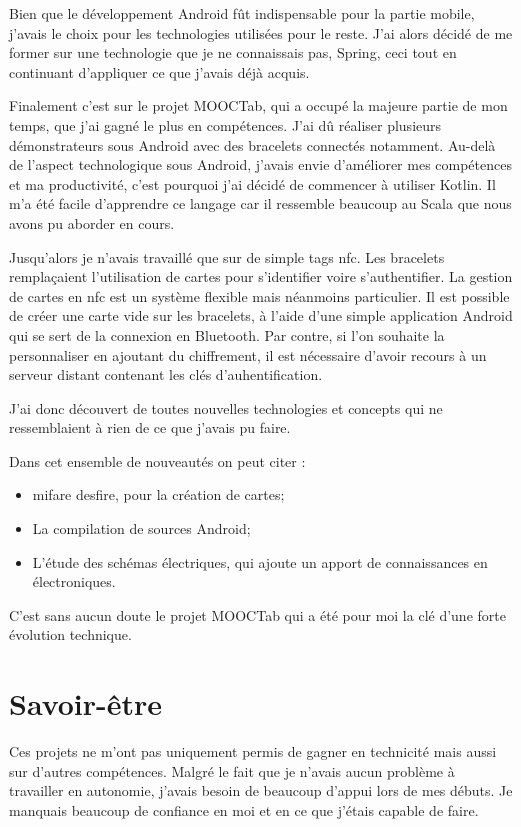 \documentclass[french,12pt,a4paper,titlepage,openright,openbib]{report}
\begin{document}
Bien que le développement Android fût indispensable pour la partie mobile, j'avais le choix pour les technologies utilisées pour le reste. J'ai alors décidé de me former sur une technologie que je ne connaissais pas, Spring, ceci tout en continuant d'appliquer ce que j'avais déjà acquis.

Finalement c'est sur le projet MOOCTab, qui a occupé la majeure partie de mon temps, que j'ai gagné le plus en compétences. J'ai dû réaliser plusieurs démonstrateurs sous Android avec des bracelets connectés notamment.
Au-delà de l'aspect technologique sous Android, j'avais envie d'améliorer mes compétences et ma productivité, c'est pourquoi j'ai décidé de commencer à utiliser Kotlin. Il m'a été facile d'apprendre ce langage car il ressemble beaucoup au Scala que nous avons pu aborder en cours. 

Jusqu'alors je n'avais travaillé que sur de simple tags \gls{nfc}. Les bracelets remplaçaient l'utilisation de cartes pour s'identifier voire s'authentifier.
La gestion de cartes en \gls{nfc} est un système flexible mais néanmoins particulier. Il est possible de créer une carte vide sur les bracelets, à l'aide d'une simple application Android qui se sert de la connexion en Bluetooth. Par contre, si l'on souhaite la personnaliser en ajoutant du chiffrement, il est nécessaire d'avoir recours à un serveur distant contenant les clés d'auhentification.

J'ai donc découvert de toutes nouvelles technologies et concepts qui ne ressemblaient à rien de ce que j'avais pu faire.
\par
Dans cet ensemble de nouveautés on peut citer :
\begin{itemize}
\item \gls{mifare} \gls{desfire}, pour la création de cartes;
\item La compilation de sources Android;
\item L'étude des schémas électriques, qui ajoute un apport de connaissances en électroniques.
\end{itemize}

\par

C'est sans aucun doute le projet MOOCTab qui a été pour moi la clé d'une forte évolution technique.
\section{Savoir-être}
Ces projets ne m'ont pas uniquement permis de gagner en technicité mais aussi sur d'autres compétences.
Malgré le fait que je n'avais aucun problème à travailler en autonomie, j'avais besoin de beaucoup d'appui lors de mes débuts. Je manquais beaucoup de confiance en moi et en ce que j'étais capable de faire.
\end{document}
